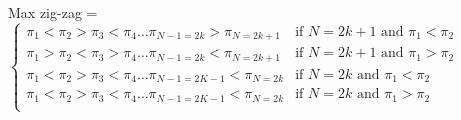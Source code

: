 \begin{caseof}

    Max zig-zag = 
        $\begin{cases}
            \pi_{1} < \pi_{2} > \pi_{3} < \pi_{4} \dots \pi_{N-1=2k} > \pi_{N=2k+1} & \mbox{if } N=2k+1 \mbox{ and } \pi_{1} < \pi_{2}\\
            \pi_{1} > \pi_{2} < \pi_{3} > \pi_{4} \dots  \pi_{N-1=2k} < \pi_{N=2k+1} & \mbox{if } N=2k+1 \mbox { and } \pi_{1} > \pi_{2}\\ 
            \pi_{1} < \pi_{2} > \pi_{3} < \pi_{4} \dots \pi_{N-1=2K-1} < \pi_{N=2k} & \mbox{if } N = 2k \mbox{ and } \pi_{1} < \pi_{2}\\ 
            \pi_{1} < \pi_{2} > \pi_{3} < \pi_{4} \dots \pi_{N-1=2K-1} < \pi_{N=2k} & \mbox{if } N = 2k \mbox{ and } \pi_{1} > \pi_{2}\\
        \end{cases}$
   
\end{caseof}



